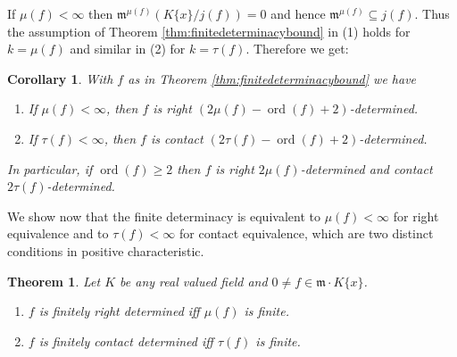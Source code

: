 \documentclass[11pt]{article}
\DeclareMathOperator{\ord}{ord}
\newtheorem{Theorem}[Definition]{Theorem}
\newtheorem{Corollary}[Definition]{Corollary}
\newcommand{\fm}{\mathfrak{m}}
\begin{document}
   
   If $\mu(f)<\infty$ then $\fm^{\mu(f)}(K\{x\}/j(f))=0$ and hence $\fm^{\mu(f)} \subseteq j(f)$. Thus the assumption of Theorem \ref{thm:finitedeterminacybound} in (1) holds for $k=\mu(f)$ and similar in (2) for    $k=\tau(f)$. Therefore we get:
   
\begin{Corollary}\label{cor:finitedeterminacybound}
With $f$ as in Theorem \ref{thm:finitedeterminacybound} we have
     \begin{enumerate}
     \item If $\mu(f)<\infty$, then  $f$ is right
       $(2\mu(f)-\ord(f)+2)$-determined.
     \item If $\tau(f)<\infty$, then  $f$ is contact
      $(2\tau(f)-\ord(f)+2)$-determined. 
     \end{enumerate} 
\noindent
     In particular, if $\ord(f) \geq 2$ then $f$ is right $2\mu(f)$-determined and contact  $2\tau(f)$-determined.    
 \end{Corollary}   
      
   We show now that the finite determinacy is equivalent to $\mu(f) < \infty$ for right equivalence and to  $\tau(f) < \infty$  for   contact equivalence, which are two distinct conditions  in positive characteristic.

\begin{Theorem}\label{thm:hypersurface}
Let $K$ be any  {real valued} field and $0\not= f\in \mathfrak{m}\cdot  K\{x\}$. 
\begin{enumerate}
\item $f$ is finitely right determined iff $\mu(f)$ is finite.
\item $f$ is finitely contact determined iff $\tau(f)$ is finite. 
\end{enumerate}
\end{Theorem}
\end{document}
